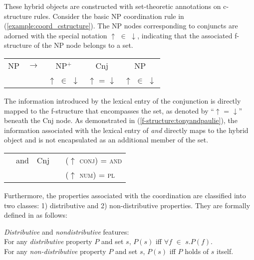These hybrid objects are constructed with set-theoretic annotations on c-structure rules.  Consider the basic NP coordination rule in (\ref{example:coord_cstructure}). The NP nodes corresponding to conjuncts are adorned with the special notation $\uparrow$ $\in$ $\downarrow$, indicating that the associated f-structure of the NP node belongs to a set. 

\pex

\vspace{-12pt}

\label{example:coord_cstructure}
\begin{tabular}{lcccc}
	NP & $\longrightarrow$ & NP$^{+}$ \hspace{15pt} & Cnj \hspace{15pt} & NP \\
	   & & $\uparrow$ $\in$ $\downarrow$ \hspace{15pt} & $\uparrow$ = $\downarrow$ \hspace{15pt} & $\uparrow$ $\in$ $\downarrow$ 
\end{tabular}
\xe

The information introduced by the lexical entry of the conjunction is directly mapped to the f-structure that encompasses the set, as denoted by ``$\uparrow$ = $\downarrow$'' beneath the Cnj node. As demonstrated in (\ref{f-structure:tonyandpaulie}), the information associated with the lexical entry of \textit{and} directly maps to the hybrid object and is not encapsulated as an additional member of the set. 

\pex
\vspace{-13pt}

\label{lexentry-and}
\begin{tabular}{lllll}
	&	and & Cnj & & ($\uparrow$ \textsc{conj}) = \textsc{and} \\
	&&&&($\uparrow$ \textsc{num}) = \textsc{pl}
\end{tabular}
\xe

Furthermore, the properties associated with the coordination are classified into two classes: 1) distributive and 2) non-distributive properties. They are formally defined in \citet[][p.\ 779]{DalrympleKaplan2000} as follows:

\pex
\textit{Distributive} and \textit{nondistributive} features:\\

For any \textit{distributive} property $P$ and set $s$, $P(s)$ iff $\forall$$f$ $\in$ $s.P(f)$.\\
For any \textit{non-distributive} property $P$ and set $s$, $P(s)$ iff $P$ holds of $s$ itself.
\xe

